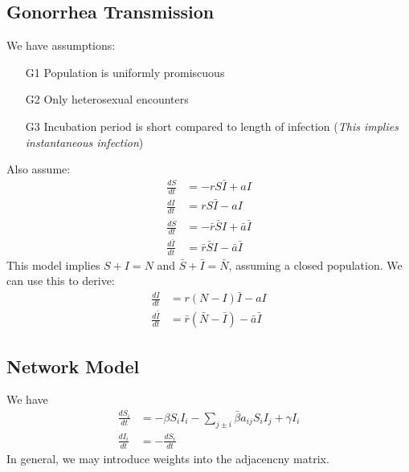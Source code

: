 \documentclass[a4paper,openany,nobib]{tufte-book}
\begin{document}
\subsection{Gonorrhea Transmission}%
\label{sub:Gonorrhea Transmission}
We have assumptions:
\begin{itemize}
	\item[G1] Population is uniformly promiscuous
	\item[G2] Only heterosexual encounters
	\item[G3] Incubation period is short compared to length of infection (\textit{This implies instantaneous infection}) 
\end{itemize}
Also assume:
\begin{align*}
	\frac{dS}{dt} &=  -rS\bar I +aI\\
	\frac{dI}{dt} &= rS\bar I -aI\\
	\frac{d\bar S}{dt} &= -\bar r\bar SI+ \bar a \bar I\\
	\frac{d\bar I}{dt} &= \bar r \bar S I - \bar a \bar I 
\end{align*}
This model implies $S+I=N$ and $\bar S + \bar I = \bar N$, assuming a closed population. We can use this to derive:
\begin{align*}
	\frac{dI}{dt} &= r\left( N-I \right)\bar I - aI \\
	\frac{d\bar I}{dt}  &=  \bar r\left( \bar N - \bar I \right) -\bar a \bar I
\end{align*}
\subsection{Network Model}%
\label{sub:Network Model}
We have 
\begin{align*}
	\frac{dS_i}{dt} &=  -\beta S_i I_i - \sum_{j \pm i}\bar \beta a_{ij}S_i I_j + \gamma I_i\\
	\frac{dI_i}{dt} &= - \frac{dS_i}{dt}  
\end{align*}
In general, we may introduce weights into the adjacencny matrix.
\end{document}
